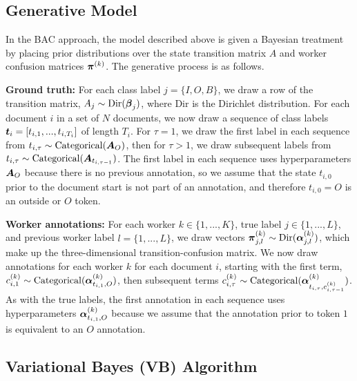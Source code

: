 \subsection{Generative Model}

In the BAC approach, the model described above is given a Bayesian treatment by placing prior distributions over the state transition matrix $A$ and worker confusion matrices $\boldsymbol\pi^{(k)}$. The generative process is as follows. 

\textbf{Ground truth:} For each class label $j=\{I, O, B\}$, we draw a row of the transition matrix, $A_j \sim \mathrm{Dir}(\boldsymbol\beta_j)$, where $\mathrm{Dir}$ is the Dirichlet distribution. 
For each document $i$ in a set of $N$ documents, we now draw a sequence of class labels $\boldsymbol t_i = [t_{i,1}, ..., t_{i, T_i}]$ of length $T_i$. For $\tau=1$, we draw the first label in each sequence from 
$t_{i,\tau} \sim \mathrm{Categorical}(\boldsymbol A_{O})$, 
then for $\tau > 1$, we draw subsequent labels from $t_{i,\tau} \sim \mathrm{Categorical}(\boldsymbol A_{t_{i,\tau-1}})$. The first label in each sequence uses hyperparameters $\boldsymbol A_{O}$ because there is no previous annotation, so we assume that the state $t_{i,0}$ prior to the document start is not part of an annotation, and therefore $t_{i,0}=O$ is an outside or $O$ token. 

\textbf{Worker annotations:} For each worker $k\in\{1,...,K\}$, true label $j\in\{1,...,L\}$, and previous worker label $l=\{1,...,L\}$, we draw vectors $\boldsymbol\pi_{j,l}^{(k)} \sim \mathrm{Dir}(\boldsymbol\alpha^{(k)}_{j,l})$, which make up the three-dimensional transition-confusion matrix. We now draw annotations for each worker $k$ for each document $i$, starting with the first term, $c_{i,1}^{(k)} \sim \mathrm{Categorical}( \boldsymbol\alpha^{(k)}_{t_{i,1}, O} )$, then subsequent terms $c_{i,\tau}^{(k)} \sim \mathrm{Categorical}( \boldsymbol\alpha^{(k)}_{t_{i,\tau}, c_{i,\tau-1}^{(k)}} )$. As with the true labels, the first annotation in each sequence uses hyperparameters $\boldsymbol\alpha^{(k)}_{t_{i,1}, O}$ because we assume that the annotation prior to token $1$ is equivalent to an $O$ annotation. 

\subsection{Variational Bayes (VB) Algorithm}

